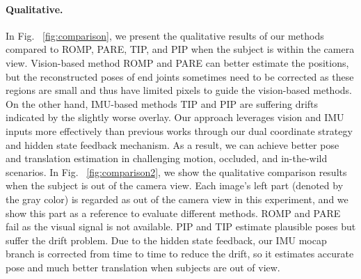 \paragraph{Qualitative.}
%
In Fig. ~\ref{fig:comparison}, we present the qualitative results of our methods compared to ROMP, PARE, TIP, and PIP when the subject is within the camera view.
%
Vision-based method ROMP and PARE can better estimate the positions, but the reconstructed poses of end joints sometimes need to be corrected as these regions are small and thus have limited pixels to guide the vision-based methods.
%
On the other hand, IMU-based methods TIP and PIP are suffering drifts indicated by the slightly worse overlay.
%
%
Our approach leverages vision and IMU inputs more effectively than previous works through our dual coordinate strategy and hidden state feedback mechanism.
%
As a result, we can achieve better pose and translation estimation in challenging motion, occluded, and in-the-wild scenarios.
%
In Fig. ~\ref{fig:comparison2}, we show the qualitative comparison results when the subject is out of the camera view.
%
Each image's left part (denoted by the gray color) is regarded as out of the camera view in this experiment, and we show this part as a reference to evaluate different methods.
%
ROMP and PARE fail as the visual signal is not available.
%
PIP and TIP estimate plausible poses but suffer the drift problem.
%
Due to the hidden state feedback, our IMU mocap branch is corrected from time to time to reduce the drift, so it estimates accurate pose and much better translation when subjects are out of view.
%
